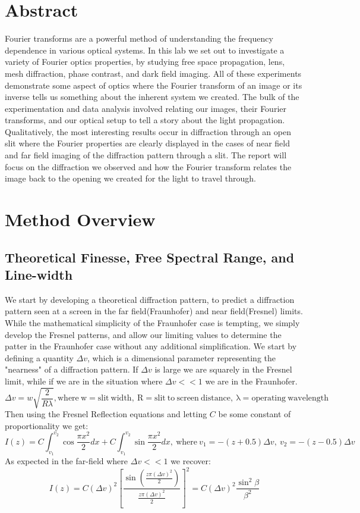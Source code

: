 \documentclass[11pt]{article}
\begin{document}
\section{Abstract}
Fourier transforms are a powerful method of understanding the frequency dependence in various optical systems. In this lab we set out to investigate a variety of Fourier optics properties, by studying free space propagation, lens, mesh diffraction, phase contrast, and dark field imaging. All of these experiments demonstrate some aspect of optics where the Fourier transform of an image or its inverse tells us something about the inherent system we created. The bulk of the experimentation and data analysis involved relating our images, their Fourier transforms, and our optical setup to tell a story about the light propagation. Qualitatively, the most interesting results occur in diffraction through an open slit where the Fourier properties are clearly displayed in the cases of near field and far field imaging of the diffraction pattern through a slit. The report will focus on the diffraction we observed and how the Fourier transform relates the image back to the opening we created for the light to travel through. 
\section{Method Overview}
\subsection{Theoretical Finesse, Free Spectral Range, and Line-width}
We start by developing a theoretical diffraction pattern, to predict a diffraction pattern seen at a screen in the far field(Fraunhofer) and near field(Fresnel) limits.   While the mathematical simplicity of the Fraunhofer case is tempting, we simply develop the Fresnel patterns, and allow our limiting values to determine the patter in the Fraunhofer case without any additional simplification. 
We start by defining a quantity $\Delta v$, which is a dimensional parameter representing the "nearness" of a diffraction pattern. If $\Delta v$ is large we are squarely in the Fresnel limit, while if we are in the situation where $\Delta v << 1$ we are in the Fraunhofer.
$$\Delta v = w \sqrt{\frac{2}{R\lambda}}, \mathrm{where\ w = slit\ width,\ R = slit\ to\ screen\ distance,\ \lambda = operating\ wavelength} $$
Then using the Fresnel Reflection equations and letting $C$ be some constant of proportionality we get:
$$ I(z) = C \int_{v_{1}}^{v_{2}}\cos{\frac{\pi x^2}{2}} dx + C\int_{v_{1}}^{v_{2}}\sin{\frac{\pi x^2}{2}} dx, \mathrm{\ where\ } v_1 = -(z+0.5)\Delta v, \ v_2 = -(z-0.5)\Delta v $$
As expected in the far-field where $\Delta v << 1$ we recover:
$$ I(z) = C (\Delta v)^2 [\frac{\sin(\frac{z\pi (\Delta v)^2}{2})}{\frac{z\pi (\Delta v)^2}{2}}]^2 = C (\Delta v)^2 \frac{\sin^2{\beta}}{\beta^2}$$
\end{document}
